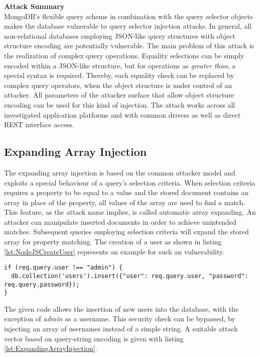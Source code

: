 \textbf{Attack Summary} \\
MongoDB's flexible query scheme in combination with the query selector objects makes the database vulnerable to query selector injection attacks. In general, all non-relational databases employing JSON-like query structures with object structure encoding are potentially vulnerable. The main problem of this attack is the realization of complex query operations. Equality selections can be simply encoded within a JSON-like structure, but for operations as \emph{greater than}, a special syntax is required. Thereby, each equality check can be replaced by complex query operators, when the object structure is under control of an attacker. All parameters of the attacker surface that allow object structure encoding can be used for this kind of injection. The attack works across all investigated application platforms and with common drivers as well as direct REST interface access. 

\subsection{Expanding Array Injection}
The expanding array injection is based on the common attacker model and exploits a special behaviour of a query's selection criteria. When selection criteria requires a property to be equal to a value and the stored document contains an array in place of the property, all values of the array are used to find a match. This feature, as the attack name implies, is called automatic array expanding. An attacker can manipulate inserted documents in order to achieve unintended matches. Subsequent queries employing selection criteria will expand the stored array for property matching. The creation of a user as shown in listing \ref{lst:NodeJSCreateUser} represents an example for such an vulnerability. \\

\begin{lstlisting}[caption={Vulnerable NodeJS example for expanding array injection against MongoDB}, label={lst:NodeJSCreateUser}]
if (req.query.user !== "admin") {
  db.collection('users').insert({"user": req.query.user, "password": req.query.password});
}
\end{lstlisting}

The given code allows the insertion of new users into the database, with the exception of \emph{admin} as a username. This security check can be bypassed, by injecting an array of usernames instead of a simple string. A suitable attack vector based on query-string encoding is given with listing \ref{lst:ExpandingArrayInjection}.\\

